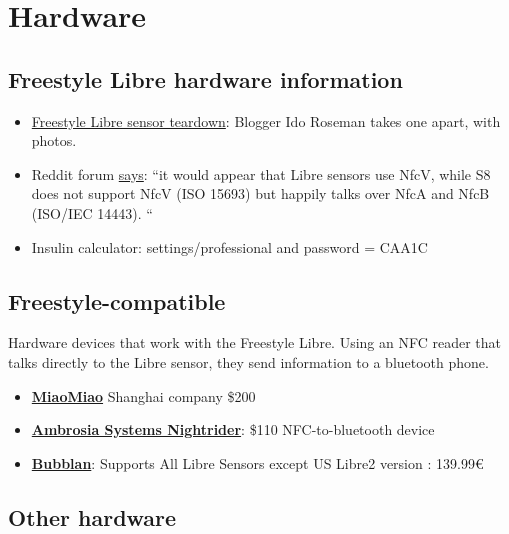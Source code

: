 \documentclass[
]{book}
\providecommand{\tightlist}{%
  \setlength{\itemsep}{0pt}\setlength{\parskip}{0pt}}
\begin{document}
\hypertarget{hardware}{%
\section{Hardware}\label{hardware}}

\hypertarget{freestyle-libre-hardware-information}{%
\subsection{Freestyle Libre hardware information}\label{freestyle-libre-hardware-information}}

\begin{itemize}
\tightlist
\item
  \href{http://idoroseman.com/freestyle-libre-blood-glucose-monitoring-system-teardown/}{Freestyle Libre sensor teardown}: Blogger Ido Roseman takes one apart, with photos.
\item
  Reddit forum \href{https://www.reddit.com/r/diabetes/comments/670qbw/librelink_and_the_s8/}{says}: ``it would appear that Libre sensors use NfcV, while S8 does not support NfcV (ISO 15693) but happily talks over NfcA and NfcB (ISO/IEC 14443). ``
\item
  Insulin calculator: settings/professional and password = CAA1C
\end{itemize}

\hypertarget{freestyle-compatible}{%
\subsection{Freestyle-compatible}\label{freestyle-compatible}}

Hardware devices that work with the Freestyle Libre. Using an NFC reader that talks directly to the Libre sensor, they send information to a bluetooth phone.

\begin{itemize}
\tightlist
\item
  \textbf{\href{https://miaomiao.cool/}{MiaoMiao}} Shanghai company \$200
\item
  \textbf{\href{https://www.ambrosiasys.com/}{Ambrosia Systems Nightrider}}: \$110 NFC-to-bluetooth device
\item
  \textbf{\href{https://www.bubblan.org/}{Bubblan}}: Supports All Libre Sensors except US Libre2 version : 139.99€
\end{itemize}

\hypertarget{other-hardware}{%
\subsection{Other hardware}\label{other-hardware}}
\end{document}
